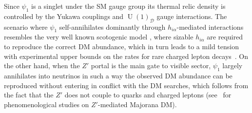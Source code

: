 \documentclass[12pt]{article}
\begin{document}
Since $\psi_{1}$ is a singlet under the SM gauge group its thermal relic density is controlled by the Yukawa couplings and $\operatorname{U}(1)_{\mathcal{D}}$ gauge interactions. 
The scenario where $\psi_{1}$ self-annihilates dominantly through $h_{i\alpha}$-mediated interactions resembles the very well known scotogenic model \cite{Ma:2006km},  
where sizable $h_{i\alpha}$ are required to reproduce the correct DM abundance, which in turn leads to a mild tension with experimental upper bounds on the rates for rare charged lepton decays~\cite{Kubo:2006yx,Sierra:2008wj,Ibarra:2016dlb}. 
On the other hand, when the $Z'$ portal \cite{Langacker:2008yv,Arcadi:2013qia} is the main gate to visible sector, $\psi_1$ largely annihilates into neutrinos in such a way the observed DM abundance can be reproduced without entering in conflict with the DM searches, which follows from the fact that the $Z'$ does not couple to quarks and charged leptons
(see~\cite{Arcadi:2013qia,Alves:2013tqa,Alves:2015pea,Alves:2016cqf,Blanco:2019hah} for phenomenological studies on $Z'$-mediated Majorana DM). 


\end{document}
